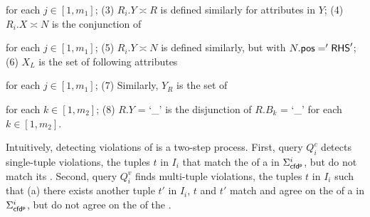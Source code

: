 \noindent for each $j\in[1, m_1]$; (3) $R_i.Y\asymp R$ is defined similarly for attributes in $Y$; (4) $R_i.X\asymp N$ is the conjunction of

\begin{footnotesize}
\end{footnotesize}

\noindent for each $j\in[1, m_1]$; (5) $R_i.Y\asymp N$ is defined similarly, but with $N.\protect\mathsf{pos}='{\mathsf{RHS}}'$; (6) $X_{L}$ is the set of following attributes

\begin{footnotesize}
\end{footnotesize}
\noindent for each $j \in [1, m_1]$; (7) Similarly, $Y_{R}$ is the set of
\begin{footnotesize}
\end{footnotesize}
\noindent for each $k \in [1, m_2]$; (8) $R.Y$ = `\_' is the disjunction of $R.B_k$ = `\_' for each $k \in [1, m_2]$.

Intuitively, detecting violations of \pCFDs is a two-step process. First, query $Q_{i}^{c}$ detects single-tuple violations, \ie the tuples $t$ in $I_{i}$ that match the \LHS of a \pCFD in $\Sigma_{{\mathsf{cfd^p}}}^i$, but do not match its \RHS. Second, query $Q_{i}^{v}$ finds multi-tuple violations, \ie the tuples $t$ in $I_{i}$ such that (a) there exists another tuple $t'$ in $I_{i}$, $t$ and $t'$ match and agree on the \LHS of a \pCFD in $\Sigma_{{\mathsf{cfd^p}}}^i$, but do not agree on the \RHS of the \pCFD.


